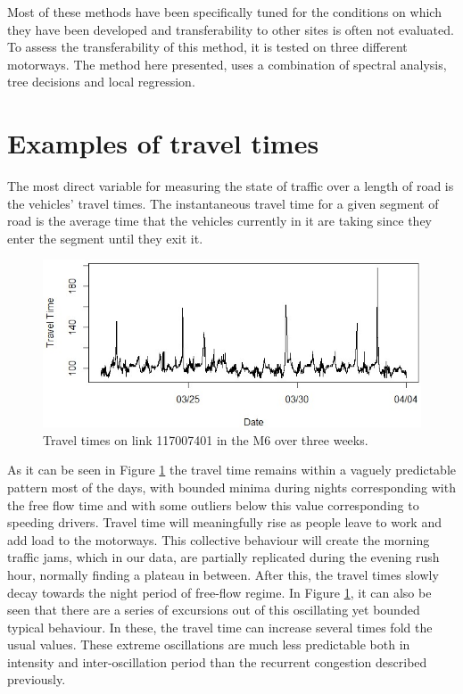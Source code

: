 \documentclass[conference, letterpaper]{IEEEtran}
\begin{document}
Most of these methods have been specifically tuned for the conditions on which they have been developed and transferability to other sites is often not evaluated.
To assess the transferability of this method, it is tested on three different motorways.
The method here presented, uses a combination of spectral analysis, tree decisions and local regression.
\section{Examples of travel times} 
The most direct variable for measuring the state of traffic over a length of road is the vehicles' travel times. 
The instantaneous travel time for a given segment of road is the average time that the vehicles currently in it are taking since they enter the segment until they exit it.\\

\begin{figure}[htbp]
	\centerline{\includegraphics[width=\linewidth]{./images/Traveltime_example2.jpg}}
	\caption{Travel times on link 117007401 in the M6 over three weeks.}
	\label{fig:travel_time_example}
\end{figure}

As it can be seen in Figure \ref{fig:travel_time_example} the travel time remains within a vaguely predictable pattern most of the days, with bounded minima during nights corresponding with the free flow time and with some outliers below this value corresponding to speeding drivers. 
Travel time will meaningfully rise as people leave to work and add load to the motorways. 
This collective behaviour will create the morning traffic jams, which in our data, are partially replicated during the evening rush hour, normally finding a plateau in between. 
After this, the travel times slowly decay towards the night period of free-flow regime.
In Figure \ref{fig:travel_time_example}, it can also be seen that there are a series of excursions out of this oscillating yet bounded typical behaviour. 
In these, the travel time can increase several times fold the usual values.
These extreme oscillations are much less predictable both in intensity and inter-oscillation period than the recurrent congestion described previously.
\end{document}
